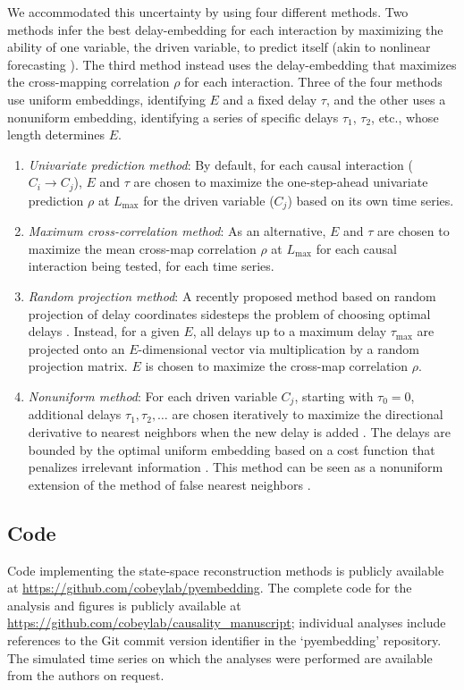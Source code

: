 We accommodated this uncertainty by using four different methods.
Two methods infer the best delay-embedding for each interaction by maximizing the ability of one variable, the driven variable, to predict itself (akin to nonlinear forecasting \cite{Sugihara1990, Sugihara1994}).
The third method instead uses the delay-embedding that maximizes the cross-mapping correlation $\rho$ for each interaction.
Three of the four methods use uniform embeddings, identifying $E$ and a fixed delay $\tau$, and the other uses a nonuniform embedding, identifying a series of specific delays $\tau_1$, $\tau_2$, etc., whose length determines $E$.

\begin{enumerate}
\item \textit{Univariate prediction method}: By default, for each causal interaction ($C_i \rightarrow C_j$), $E$ and $\tau$ are chosen to maximize the one-step-ahead univariate prediction $\rho$ at $L_{\max}$ for the driven variable ($C_j$) based on its own time series.
\item \textit{Maximum cross-correlation method}: As an alternative, $E$ and $\tau$ are chosen to maximize the mean cross-map correlation $\rho$ at $L_\text{max}$ for each causal interaction being tested, for each time series.
\item \textit{Random projection method}: A recently proposed method based on random projection of delay coordinates sidesteps the problem of choosing optimal delays \cite{Tajima2015}. Instead, for a given $E$, all delays up to a maximum delay $\tau_{\max}$ are projected onto an $E$-dimensional vector via multiplication by a random projection matrix. $E$ is chosen to maximize the cross-map correlation $\rho$.
\item \textit{Nonuniform method}: For each driven variable $C_j$, starting with $\tau_0 = 0$, additional delays $\tau_1, \tau_2, \ldots$ are chosen iteratively to maximize the directional derivative to nearest neighbors when the new delay is added \cite{Nichkawde2013}. The delays are bounded by the optimal uniform embedding based on a cost function that penalizes irrelevant information \cite{Uzal2011}. This method can be seen as a nonuniform extension of the method of false nearest neighbors \cite{Kennel1992}.
\end{enumerate}


\subsection*{Code}
Code implementing the state-space reconstruction methods is publicly available at \url{https://github.com/cobeylab/pyembedding}.
The complete code for the analysis and figures is publicly available at \url{https://github.com/cobeylab/causality_manuscript}; individual analyses include references to the Git commit version identifier in the `pyembedding' repository.
The simulated time series on which the analyses were performed are available from the authors on request.

